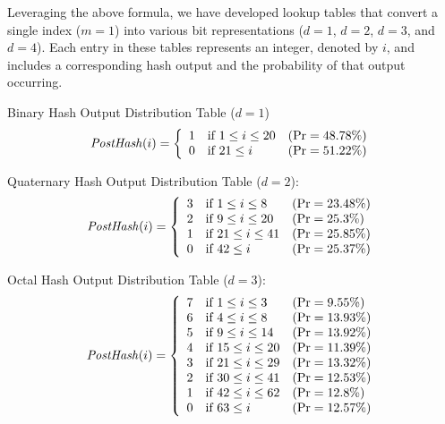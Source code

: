 Leveraging the above formula, we have developed lookup tables that convert a single index (\(m = 1\)) into various bit representations (\(d=1\), \(d=2\), \(d=3\), and \(d=4\)). Each entry in these tables represents an integer, denoted by \(i\), and includes a corresponding hash output and the probability of that output occurring.

Binary Hash Output Distribution Table (\(d=1\))
{\renewcommand{\arraystretch}{1.25}
\[
\text{\textit{PostHash}}(i) = \left\{
    \begin{array}{lll}
        \text{1}  & \text{if } 1 \leq i \leq 20 & (\text{Pr} = 48.78\%)
        \\
        \text{0}  & \text{if } 21 \leq i & (\text{Pr} = 51.22\%)
        \\
    \end{array}
\right.    
\]}


Quaternary Hash Output Distribution Table (\(d=2\)):
{\renewcommand{\arraystretch}{1.25}
\[
\text{\textit{PostHash}}(i) = \left\{
    \begin{array}{lll}
        \text{3}  & \text{if } 1 \leq i \leq 8 & (\text{Pr} = 23.48\%)
        \\
        \text{2}  & \text{if } 9 \leq i \leq 20 & (\text{Pr} = 25.3\%)
        \\
        \text{1}  & \text{if } 21 \leq i \leq 41 & (\text{Pr} = 25.85\%)
        \\
        \text{0}  & \text{if } 42 \leq i & (\text{Pr} = 25.37\%)
        \\
    \end{array}
\right.    
\]}

Octal Hash Output Distribution Table (\(d=3\)):
{\renewcommand{\arraystretch}{1.25}
\[
\text{\textit{PostHash}}(i) = \left\{
    \begin{array}{lll}
        \text{7}  & \text{if } 1 \leq i \leq 3 & (\text{Pr} = 9.55\%)
        \\
        \text{6}  & \text{if } 4 \leq i \leq 8 & (\text{Pr} = 13.93\%)
        \\
        \text{5}  & \text{if } 9 \leq i \leq 14 & (\text{Pr} = 13.92\%)
        \\
        \text{4}  & \text{if } 15 \leq i \leq 20 & (\text{Pr} = 11.39\%)
        \\
        \text{3}  & \text{if } 21 \leq i \leq 29 & (\text{Pr} = 13.32\%)
        \\
        \text{2}  & \text{if } 30 \leq i \leq 41 & (\text{Pr} = 12.53\%)
        \\
        \text{1}  & \text{if } 42 \leq i \leq 62 & (\text{Pr} = 12.8\%)
        \\
        \text{0}  & \text{if } 63 \leq i & (\text{Pr} = 12.57\%)
        \\
    \end{array}
\right.    
\]}


